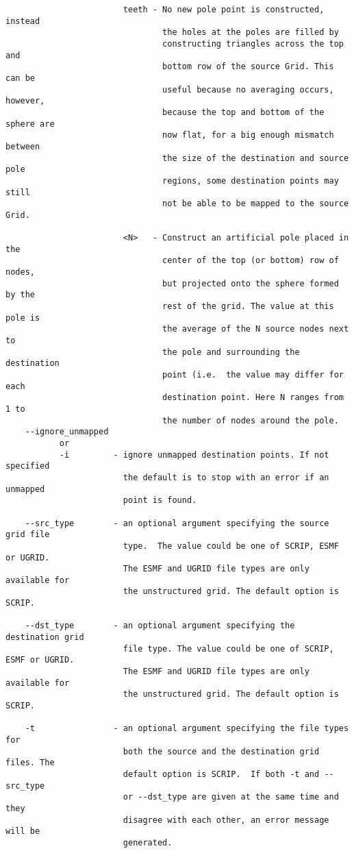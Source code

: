 \begin{verbatim}
                        teeth - No new pole point is constructed, instead 
                                the holes at the poles are filled by 
                                constructing triangles across the top and 
                                bottom row of the source Grid. This can be 
                                useful because no averaging occurs, however, 
                                because the top and bottom of the sphere are 
                                now flat, for a big enough mismatch between 
                                the size of the destination and source pole 
                                regions, some destination points may still 
                                not be able to be mapped to the source Grid. 

                        <N>   - Construct an artificial pole placed in the 
                                center of the top (or bottom) row of nodes, 
                                but projected onto the sphere formed by the 
                                rest of the grid. The value at this pole is 
                                the average of the N source nodes next to
                                the pole and surrounding the destination 
                                point (i.e.  the value may differ for each 
                                destination point. Here N ranges from 1 to 
                                the number of nodes around the pole. 
    --ignore_unmapped
           or 
           -i         - ignore unmapped destination points. If not specified
                        the default is to stop with an error if an unmapped
                        point is found. 

    --src_type        - an optional argument specifying the source grid file 
                        type.  The value could be one of SCRIP, ESMF or UGRID.  
                        The ESMF and UGRID file types are only available for 
                        the unstructured grid. The default option is SCRIP.

    --dst_type        - an optional argument specifying the destination grid 
                        file type. The value could be one of SCRIP, ESMF or UGRID.  
                        The ESMF and UGRID file types are only available for 
                        the unstructured grid. The default option is SCRIP.

    -t                - an optional argument specifying the file types for 
                        both the source and the destination grid files. The 
                        default option is SCRIP.  If both -t and --src_type 
                        or --dst_type are given at the same time and they 
                        disagree with each other, an error message will be 
                        generated.


\end{verbatim}
